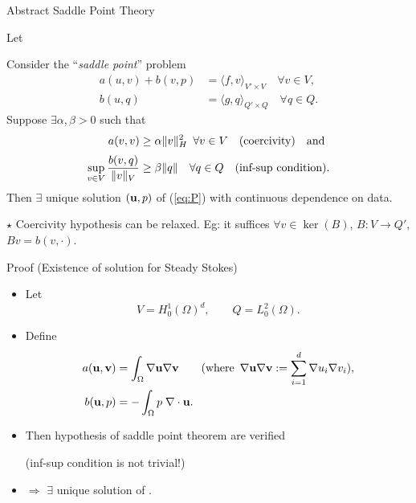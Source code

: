 \begin{frame}{Abstract Saddle Point Theory}
  \begin{theorem}
    Let 
    \vspace{+0.75em}
    ~\par
    Consider the ``\textit{saddle point}'' problem\vspace{-0.5em}
    \begin{equation}
      \tag{P}
      \begin{split}
        a(u,v) + b(v,p) &= \langle f, v \rangle_{V'\times V} \quad
        \forall v\in V,
        \\[0.2em]
        b(u,q) &= \langle g, q \rangle_{Q'\times Q} \quad \forall q\in
        Q.
      \end{split}\label{eq:P}
    \end{equation}
    Suppose $\exists \alpha, \beta>0$ such that\vspace{-0.5em}
    \begin{align*}
      a(v,v) &\ge \alpha \|v\|_H^2 \enspace \forall v\in V \quad\text{(coercivity)} \quad\text{and}
      \\[0.2em]
      \sup_{v \in V}{\frac{b(v,q)}{\|v\|_{V}}} &\ge \beta\|q\| \quad \forall q\in Q\quad\text{(inf-sup condition)} .
    \end{align*}
    Then $\exists$ unique solution $(\mathbf{u},p)$ of (\ref{eq:P}) with continuous dependence on data.
  \end{theorem}
  \par
  \hfill{\scriptsize $\star$ Coercivity hypothesis can be relaxed. Eg: it suffices $\forall v\in\mathop{ker}(B)$, $B:V\to Q'$, $Bv=b(v,\cdot)$.}
\end{frame}

\begin{frame}{Proof (Existence of solution for Steady Stokes)}
  \begin{itemize}\itemsep1em
  \item Let
    \begin{equation*}
      V = H_0^1(\Omega)^d, \qquad Q= L_0^2(\Omega).\label{eq:1}
    \end{equation*}
  \item Define
    \begin{align*}
    a(\mathbf{u},\mathbf{v})&=\int_\Omega \nabla \mathbf{u} \nabla \mathbf{v}
                     \qquad (\text{where}\enspace \nabla \mathbf{u} \nabla \mathbf{v} := \sum_{i=1}^d \nabla u_i \nabla v_i),
      \\
    b(\mathbf{u},p)&=-\int_\Omega p\; \nabla\cdot{}\mathbf{u}.
    \end{align*}
  \item Then hypothesis of saddle point theorem are verified
    \par \hfill{\color{PHDgray} (inf-sup condition is not trivial!)}
  \item[] $\Rightarrow$ $\exists$ unique solution of \steadyStokes.
  \end{itemize}
\end{frame}

